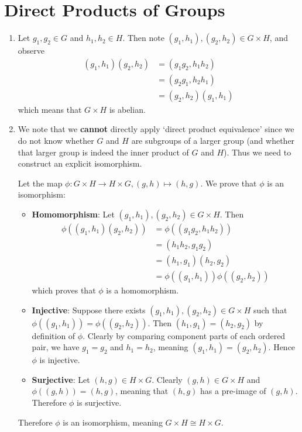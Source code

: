 \section{Direct Products of Groups}
\begin{enumerate}
    \item Let $g_1, g_2 \in G$ and $h_1, h_2 \in H$. Then note $(g_1, h_1), (g_2, h_2) \in G\times H$, and observe
    \begin{align*}
        (g_1, h_1)(g_2, h_2) &= (g_1g_2, h_1h_2)\\
        &= (g_2g_1, h_2h_1)\\
        &= (g_2,h_2)(g_1,h_1)
    \end{align*}
    which means that $G \times H$ is abelian.

    \item We note that we \textbf{cannot} directly apply `direct product equivalence' since we do not know whether $G$ and $H$ are subgroups of a larger group (and whether that larger group is indeed the inner product of $G$ and $H$). Thus we need to construct an explicit isomorphism.

    Let the map $\phi: G\times H \to H \times G, (g, h) \mapsto (h, g)$. We prove that $\phi$ is an isomorphism:
    \begin{itemize}
        \item \textbf{Homomorphism}: Let $(g_1, h_1), (g_2, h_2) \in G \times H$. Then
        \begin{align*}
            \phi((g_1, h_1)(g_2, h_2)) &= \phi((g_1g_2, h_1h_2))\\
            &= (h_1h_2, g_1g_2)\\
            &= (h_1, g_1)(h_2, g_2)\\
            &= \phi((g_1, h_1))\phi((g_2, h_2))
        \end{align*}
        which proves that $\phi$ is a homomorphism.
        \item \textbf{Injective}: Suppose there exists $(g_1, h_1), (g_2, h_2) \in G \times H$ such that $\phi((g_1, h_1)) = \phi((g_2, h_2))$. Then $(h_1, g_1) = (h_2, g_2)$ by definition of $\phi$. Clearly by comparing component parts of each ordered pair, we have $g_1 = g_2$ and $h_1 = h_2$, meaning $(g_1, h_1) = (g_2, h_2)$. Hence $\phi$ is injective.
        \item \textbf{Surjective}: Let $(h, g) \in H \times G$. Clearly $(g, h) \in G \times H$ and $\phi((g, h)) = (h, g)$, meaning that $(h, g)$ has a pre-image of $(g, h)$. Therefore $\phi$ is surjective.
    \end{itemize}
    Therefore $\phi$ is an isomorphism, meaning $G \times H \cong H \times G$.


\end{enumerate}
